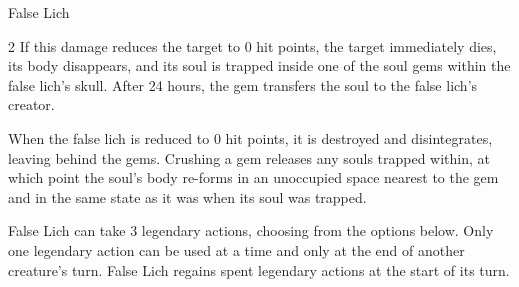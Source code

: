 \documentclass[10pt,a4paper,twoside,bg=print,twocolumn,openany,nodeprecatedcode]{dndbook}
\begin{document}
\begin{DndMonster}[float*=b,width=\textwidth + 8pt]{False Lich}
\begin{multicols}{2}
If this damage reduces the target to 0 hit points, the target immediately dies, its body disappears, and its soul is trapped inside one of the soul gems within the false lich's skull. After 24 hours, the gem transfers the soul to the false lich's creator.

When the false lich is reduced to 0 hit points, it is destroyed and disintegrates, leaving behind the gems. Crushing a gem releases any souls trapped within, at which point the soul's body re-forms in an unoccupied space nearest to the gem and in the same state as it was when its soul was trapped.

False Lich can take 3 legendary actions, choosing from the options below. Only one legendary action can be used at a time and only at the end of another creature's turn. False Lich regains spent legendary actions at the start of its turn.

\begin{DndMonsterLegendaryActions}
\end{DndMonsterLegendaryActions}
\end{multicols}
\end{DndMonster}
\end{document}
